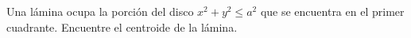 \item Una lámina ocupa la porción del disco $x^2 + y^2 \le a^2$ que se encuentra en el primer cuadrante. Encuentre el centroide de la lámina.
